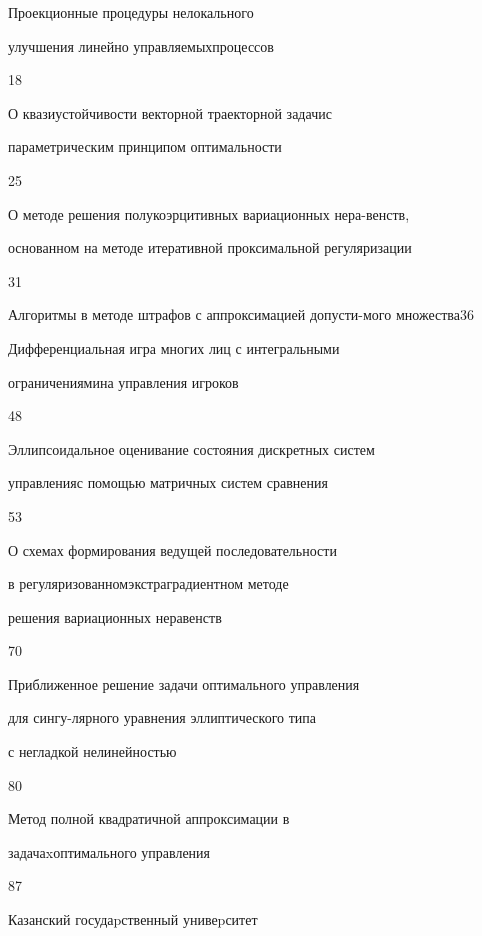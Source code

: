 {Проекционные процедуры нелокального 


улучшения линейно управляемых\newline процессов}{18}




{О квазиустойчивости векторной траекторной задачи\newline с


параметрическим принципом оптимальности}{25}




{О методе решения полукоэрцитивных вариационных нера-\newline венств,


основанном на методе итеративной проксимальной регуляризации}{31}




{Алгоритмы в методе штрафов с аппроксимацией допусти-\newline мого множества}{36}




{Дифференциальная игра многих лиц с интегральными


ограничениями\newline на управления игроков}{48}




{Эллипсоидальное оценивание состояния дискретных систем


управления\newline с помощью матричных систем сравнения}{53}




{О схемах формирования ведущей последовательности 


в регуляризованном\newline экстраградиентном методе


решения вариационных неравенств}{70}




{Приближенное решение задачи оптимального управления 


для сингу-\newline лярного уравнения эллиптического типа 


с негладкой нелинейностью}{80}




{Метод полной квадратичной аппроксимации в


задачаx\newline оптимального управления}{87}














\vfill


\noindent\raisebox{2pt}{\copyright} Казанский госудаpственный унивеpситет





